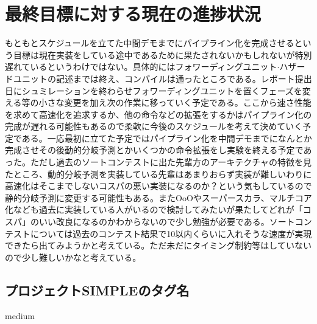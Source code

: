 \documentclass[a4paper,11pt,oneside,openany]{jsarticle}
\begin{document}
\section{最終目標に対する現在の進捗状況}
もともとスケジュールを立てた中間デモまでにパイプライン化を完成させるという目標は現在実装をしている途中であるために果たされないかもしれないが特別遅れているというわけではない。具体的にはフォワーディングユニット$\cdot$ハザードユニットの記述までは終え、コンパイルは通ったところである。レポート提出日にシュミレーションを終わらせフォワーディングユニットを置くフェーズを変える等の小さな変更を加え次の作業に移っていく予定である。ここから速さ性能を求めて高速化を追求するか、他の命令などの拡張をするかはパイプライン化の完成が遅れる可能性もあるので柔軟に今後のスケジュールを考えて決めていく予定である。一応最初に立てた予定ではパイプライン化を中間デモまでになんとか完成させその後動的分岐予測とかいくつかの命令拡張をし実験を終える予定であった。ただし過去のソートコンテストに出た先輩方のアーキテクチャの特徴を見たところ、動的分岐予測を実装している先輩はあまりおらず実装が難しいわりに高速化はそこまでしないコスパの悪い実装になるのか？という気もしているので静的分岐予測に変更する可能性もある。またOoOやスーパースカラ、マルチコア化なども過去に実装している人がいるので検討してみたいが果たしてどれが「コスパ」のいい改良になるのかわからないので少し勉強が必要である。ソートコンテストについては過去のコンテスト結果で10以内くらいに入れそうな速度が実現できたら出てみようかと考えている。ただ未だにタイミング制約等はしていないので少し難しいかなと考えている。

\subsection{プロジェクトSIMPLEのタグ名}
medium
\end{document}

